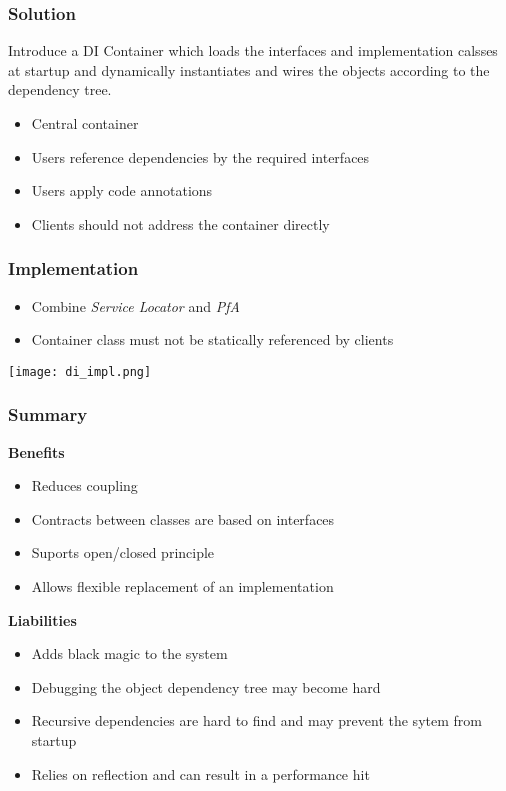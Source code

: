 \subsubsection{Solution}
Introduce a DI Container which loads the interfaces and implementation calsses at startup and dynamically instantiates and wires the objects according to the dependency tree.
\begin{itemize}
    \item Central container
    \item Users reference dependencies by the required interfaces
    \item Users apply code annotations
    \item Clients should not address the container directly
\end{itemize}
\subsubsection{Implementation}
\begin{itemize}
    \item Combine \textit{Service Locator} and \textit{PfA}
    \item Container class must not be statically referenced by clients
\end{itemize}
\texttt{[image: di\_impl.png]}
\subsubsection{Summary}
\textbf{Benefits}
\begin{itemize}
    \item Reduces coupling
    \item Contracts between classes are based on interfaces
    \item Suports open/closed principle
    \item Allows flexible replacement of an implementation
\end{itemize}
\textbf{Liabilities}
\begin{itemize}
    \item Adds black magic to the system
    \item Debugging the object dependency tree may become hard
    \item Recursive dependencies are hard to find and may prevent the sytem from startup
    \item Relies on reflection and can result in a performance hit
\end{itemize}
